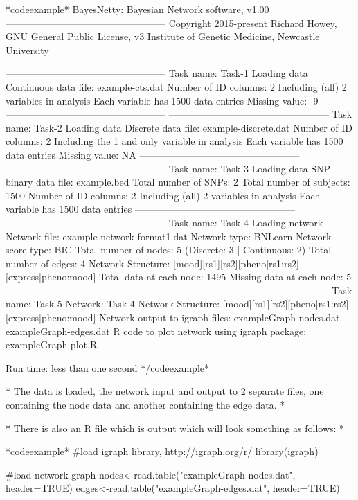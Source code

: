 *codeexample* BayesNetty: Bayesian Network software, v1.00 -------------------------------------------------- Copyright 2015-present Richard Howey, GNU General Public License, v3 Institute of Genetic Medicine, Newcastle University

-------------------------------------------------- Task name: Task-1 Loading data Continuous data file: example-cts.dat Number of ID columns: 2 Including (all) 2 variables in analysis Each variable has 1500 data entries Missing value: -9 -------------------------------------------------- -------------------------------------------------- Task name: Task-2 Loading data Discrete data file: example-discrete.dat Number of ID columns: 2 Including the 1 and only variable in analysis Each variable has 1500 data entries Missing value: NA -------------------------------------------------- -------------------------------------------------- Task name: Task-3 Loading data SNP binary data file: example.bed Total number of SNPs: 2 Total number of subjects: 1500 Number of ID columns: 2 Including (all) 2 variables in analysis Each variable has 1500 data entries -------------------------------------------------- -------------------------------------------------- Task name: Task-4 Loading network Network file: example-network-format1.dat Network type: BNLearn Network score type: BIC Total number of nodes: 5 (Discrete: 3 | Continuous: 2) Total number of edges: 4 Network Structure: [mood][rs1][rs2][pheno|rs1:rs2][express|pheno:mood] Total data at each node: 1495 Missing data at each node: 5 -------------------------------------------------- -------------------------------------------------- Task name: Task-5 Network: Task-4 Network Structure: [mood][rs1][rs2][pheno|rs1:rs2][express|pheno:mood] Network output to igraph files:
 exampleGraph-nodes.dat
 exampleGraph-edges.dat
R code to plot network using igraph package: exampleGraph-plot.R --------------------------------------------------

Run time: less than one second */codeexample*

* The data is loaded, the network input and output to 2 separate files, one containing the node data and another containing the edge data. *

* There is also an R file which is output which will look something as follows: *

*codeexample* #load igraph library, http://igraph.org/r/ library(igraph)

#load network graph nodes<-read.table("exampleGraph-nodes.dat", header=TRUE) edges<-read.table("exampleGraph-edges.dat", header=TRUE)

